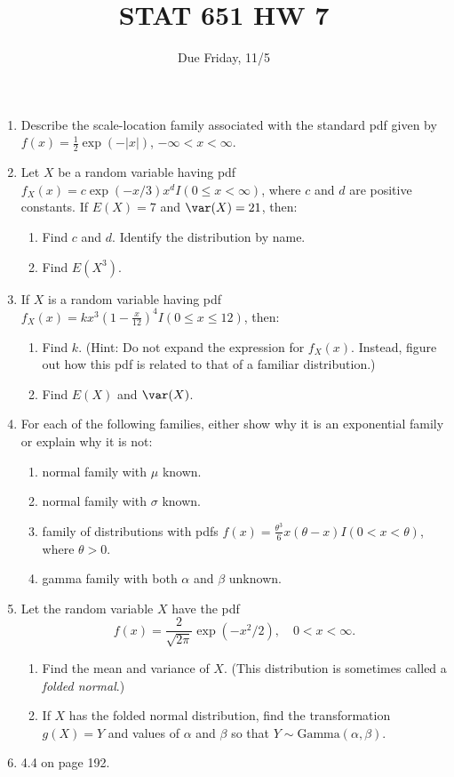 \documentclass[12pt]{article}
\begin{document}
\title{STAT 651 HW 7}
\author{Due Friday, 11/5}
\date{}
\maketitle

\begin{enumerate}
\item Describe the scale-location family associated with the standard pdf
given by $f(x) = \frac{1}{2}\exp(-|x|)$, $-\infty < x < \infty.$

\item Let $X$ be a random variable having
pdf $f_X(x) = c \exp(-x/3) x^d I(0\le x < \infty)$,
where $c$ and $d$ are positive constants.
If $E(X) = 7$ and $\var(X) = 21$, then:
  \begin{enumerate}
  \item Find $c$ and $d$.  Identify the distribution by name.
  \item Find $E(X^3)$.
  \end{enumerate}

\item If $X$ is a random variable having
pdf $f_X(x) = k x^{3}(1-\frac{x}{12})^4 I(0\le x \le 12)$,
then:
  \begin{enumerate}
  \item Find $k$. (Hint:  Do not expand the expression for $f_X(x)$.
Instead, figure out how this pdf is related to that of a familiar distribution.)
  \item Find $E(X)$ and $\var(X)$.
  \end{enumerate}

\item For each of the following families, either show why it is
an exponential family or explain why it is not:

  \begin{enumerate}
  \item normal family with $\mu$ known.
  \item normal family with $\sigma$ known.
  \item family of distributions with
  pdfs $f(x) = \frac{\theta^3}{6}x(\theta-x)I(0 < x < \theta)$,
  where $\theta > 0$.
  \item gamma family with both $\alpha$ and $\beta$ unknown.
  \end{enumerate}

\item
Let the random variable $X$ have the pdf
\[
f(x) = \frac{2}{\sqrt{2\pi}}\exp(-x^2/2),
\quad 0 < x < \infty.
\]
\begin{enumerate}
\item
Find the mean and variance of $X$.
(This distribution is sometimes called a {\em{folded normal}}.)

\item If $X$ has the folded normal distribution,
find the transformation $g(X)=Y$ and values of
$\alpha$ and $\beta$ so that $Y \sim \text{Gamma}(\alpha,\beta)$.
\end{enumerate}

\item 4.4 on page 192.
\end{enumerate}
\end{document}

